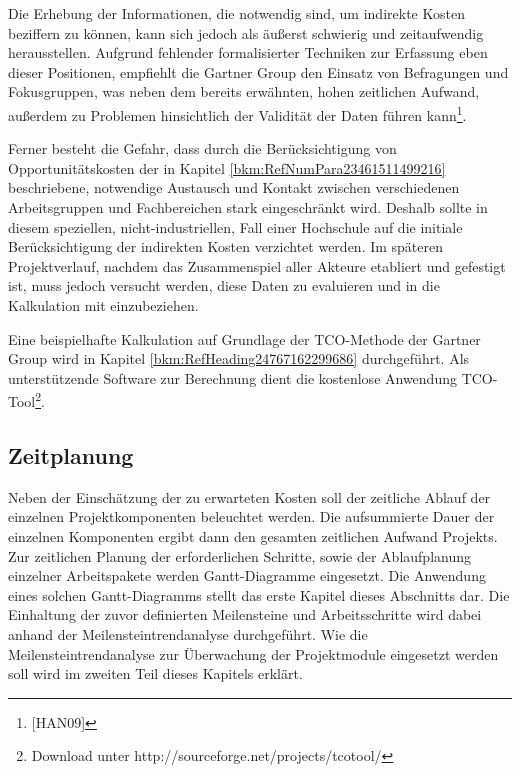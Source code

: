 \documentclass[a4paper]{article}
\begin{document}
\bigskip

{\sffamily
Die Erhebung der Informationen, die notwendig sind, um indirekte Kosten beziffern zu können, kann sich jedoch als
äußerst schwierig und zeitaufwendig herausstellen. Aufgrund fehlender formalisierter Techniken zur Erfassung eben
dieser Positionen, empfiehlt die Gartner Group den Einsatz von Befragungen und Fokusgruppen, was neben dem bereits
erwähnten, hohen zeitlichen Aufwand, außerdem zu Problemen hinsichtlich der Validität der Daten führen
kann\footnote{[HAN09]}.}


\bigskip

{\sffamily
Ferner besteht die Gefahr, dass durch die Berücksichtigung von Opportunitätskosten der in Kapitel
\ref{bkm:RefNumPara23461511499216} beschriebene, notwendige Austausch und Kontakt zwischen verschiedenen Arbeitsgruppen
und Fachbereichen stark eingeschränkt wird. Deshalb sollte in diesem speziellen, nicht-industriellen, Fall einer
Hochschule auf die initiale Berücksichtigung der indirekten Kosten verzichtet werden. Im späteren Projektverlauf,
nachdem das Zusammenspiel aller Akteure etabliert und gefestigt ist, muss jedoch versucht werden, diese Daten zu
evaluieren und in die Kalkulation mit einzubeziehen.}


\bigskip

{\sffamily
Eine beispielhafte Kalkulation auf Grundlage der TCO-Methode der Gartner Group wird in Kapitel
\ref{bkm:RefHeading24767162299686} durchgeführt. Als unterstützende Software zur Berechnung dient die kostenlose
Anwendung TCO-Tool\footnote{Download unter http://sourceforge.net/projects/tcotool/}.}

\subsection{Zeitplanung}
{\sffamily
Neben der Einschätzung der zu erwarteten Kosten soll der zeitliche Ablauf der einzelnen Projektkomponenten beleuchtet
werden. Die aufsummierte Dauer der einzelnen Komponenten ergibt dann den gesamten zeitlichen Aufwand Projekts. Zur
zeitlichen Planung der erforderlichen Schritte, sowie der Ablaufplanung einzelner Arbeitspakete werden Gantt-Diagramme
eingesetzt. Die Anwendung eines solchen Gantt-Diagramms stellt das erste Kapitel dieses Abschnitts dar. Die Einhaltung
der zuvor definierten Meilensteine und Arbeitsschritte wird dabei anhand der Meilensteintrendanalyse durchgeführt. Wie
die Meilensteintrendanalyse zur Überwachung der Projektmodule eingesetzt werden soll wird im zweiten Teil dieses
Kapitels erklärt. }
\end{document}
